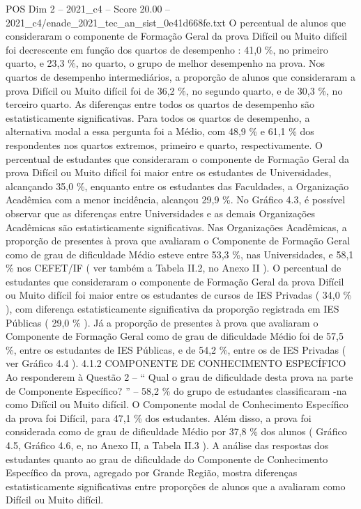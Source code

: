 \begin{textsample}{POS Dim 2 – 2021\_c4 – Score 20.00 – 2021\_c4/enade\_2021\_tec\_an\_sist\_0e41d668fe.txt}
O percentual de alunos que consideraram o componente de Formação Geral da prova Difícil ou Muito difícil foi decrescente em função dos quartos de desempenho : 41,0 \%, no primeiro quarto, e 23,3 \%, no quarto, o grupo de melhor desempenho na prova.
Nos quartos de desempenho intermediários, a proporção de alunos que consideraram a prova Difícil ou Muito difícil foi de 36,2 \%, no segundo quarto, e de 30,3 \%, no terceiro quarto.
As diferenças entre todos os quartos de desempenho são estatisticamente significativas.
Para todos os quartos de desempenho, a alternativa modal a essa pergunta foi a Médio, com 48,9 \% e 61,1 \% dos respondentes nos quartos extremos, primeiro e quarto, respectivamente.
O percentual de estudantes que consideraram o componente de Formação Geral da prova Difícil ou Muito difícil foi maior entre os estudantes de Universidades, alcançando 35,0 \%, enquanto entre os estudantes das Faculdades, a Organização Acadêmica com a menor incidência, alcançou 29,9 \%.
No Gráfico 4.3, é possível observar que as diferenças entre Universidades e as demais Organizações Acadêmicas são estatisticamente significativas.
Nas Organizações Acadêmicas, a proporção de presentes à prova que avaliaram o Componente de Formação Geral como de grau de dificuldade Médio esteve entre 53,3 \%, nas Universidades, e 58,1 \% nos CEFET/IF ( ver também a Tabela II.2, no Anexo II ).
O percentual de estudantes que consideraram o componente de Formação Geral da prova Difícil ou Muito difícil foi maior entre os estudantes de cursos de IES Privadas ( 34,0 \% ), com diferença estatisticamente significativa da proporção registrada em IES Públicas ( 29,0 \% ).
Já a proporção de presentes à prova que avaliaram o Componente de Formação Geral como de grau de dificuldade Médio foi de 57,5 \%, entre os estudantes de IES Públicas, e de 54,2 \%, entre os de IES Privadas ( ver Gráfico 4.4 ). 4.1.2 COMPONENTE DE CONHECIMENTO ESPECÍFICO Ao responderem à Questão 2 – “ Qual o grau de dificuldade desta prova na parte de Componente Específico? ” – 58,2 \% do grupo de estudantes classificaram -na como Difícil ou Muito difícil.
O Componente modal de Conhecimento Específico da prova foi Difícil, para 47,1 \% dos estudantes.
Além disso, a prova foi considerada como de grau de dificuldade Médio por 37,8 \% dos alunos ( Gráfico 4.5, Gráfico 4.6, e, no Anexo II, a Tabela II.3 ).
A análise das respostas dos estudantes quanto ao grau de dificuldade do Componente de Conhecimento Específico da prova, agregado por Grande Região, mostra diferenças estatisticamente significativas entre proporções de alunos que a avaliaram como Difícil ou Muito difícil.

\end{textsample}
